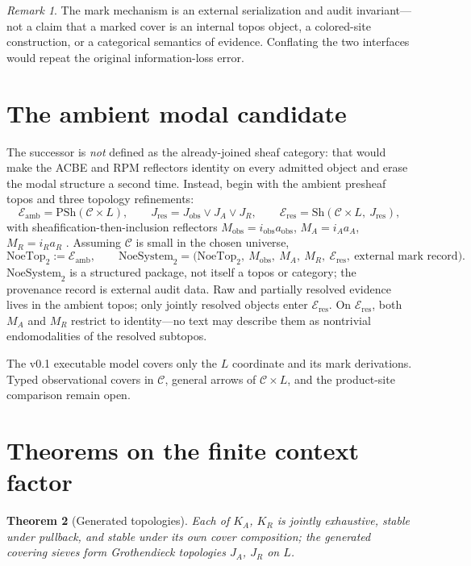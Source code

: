 \documentclass[11pt]{amsart}
\newtheorem{theorem}{Theorem}[section]
\theoremstyle{definition}
\theoremstyle{remark}
\newtheorem{remark}[theorem]{Remark}
\newcommand{\PSh}{\mathrm{PSh}}
\newcommand{\Sh}{\mathrm{Sh}}
\newcommand{\Eamb}{\mathcal{E}_{\mathrm{amb}}}
\newcommand{\Eres}{\mathcal{E}_{\mathrm{res}}}
\begin{document}
\begin{remark}
The mark mechanism is an external serialization and audit invariant---not a claim that a marked cover is an internal topos object, a colored-site construction, or a categorical semantics of evidence. Conflating the two interfaces would repeat the original information-loss error.
\end{remark}

\section{The ambient modal candidate}

The successor is \emph{not} defined as the already-joined sheaf category: that would make the ACBE and RPM reflectors identity on every admitted object and erase the modal structure a second time. Instead, begin with the ambient presheaf topos and three topology refinements:
\[
\Eamb = \PSh(\mathcal{C}\times L), \qquad
J_{\mathrm{res}} = J_{\mathrm{obs}} \vee J_A \vee J_R, \qquad
\Eres = \Sh(\mathcal{C}\times L,\ J_{\mathrm{res}}),
\]
with sheafification-then-inclusion reflectors $M_{\mathrm{obs}}=i_{\mathrm{obs}}a_{\mathrm{obs}}$, $M_A=i_A a_A$, $M_R=i_R a_R$ \cite{stacks00W1}. Assuming $\mathcal{C}$ is small in the chosen universe,
\[
\mathrm{NoeTop}_2 := \Eamb, \qquad
\mathrm{NoeSystem}_2 = \bigl(\mathrm{NoeTop}_2,\ M_{\mathrm{obs}},\ M_A,\ M_R,\ \Eres,\ \text{external mark record}\bigr).
\]
$\mathrm{NoeSystem}_2$ is a structured package, not itself a topos or category; the provenance record is external audit data. Raw and partially resolved evidence lives in the ambient topos; only jointly resolved objects enter $\Eres$. On $\Eres$, both $M_A$ and $M_R$ restrict to identity---no text may describe them as nontrivial endomodalities of the resolved subtopos.

The v0.1 executable model covers only the $L$ coordinate and its mark derivations. Typed observational covers in $\mathcal{C}$, general arrows of $\mathcal{C}\times L$, and the product-site comparison remain open.

\section{Theorems on the finite context factor}

\begin{theorem}[Generated topologies]\label{thm:nt2-1}
Each of $K_A$, $K_R$ is jointly exhaustive, stable under pullback, and stable under its own cover composition; the generated covering sieves form Grothendieck topologies $J_A$, $J_R$ on $L$.
\end{theorem}
\end{document}
